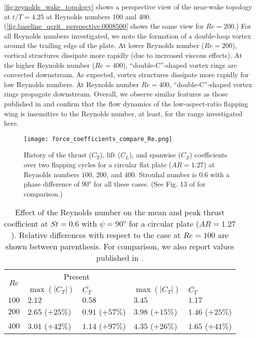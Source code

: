 \cref{fig:reynolds_wake_topology} shows a perspective view of the near-wake topology at $t/T = 4.25$ at Reynolds numbers $100$ and $400$.
(\cref{fig:baseline_qcrit_perspective:0008500} shows the same view for $Re = 200$.)
For all Reynolds numbers investigated, we note the formation of a double-loop vortex around the trailing edge of the plate.
At lower Reynolds number ($Re = 200$), vortical structures dissipate more rapidly (due to increased viscous effects).
At the higher  Reynolds number ($Re = 400$), ``double-C''-shaped vortex rings are convected downstream.
As expected, vortex structures dissipate more rapidly for low Reynolds numbers.
At Reynolds number $Re = 400$, ``double-C''-shaped vortex rings propagate downstream.
Overall, we observe similar features as those published in \citet{li_dong_2016} and confirm that the flow dynamics of the low-aspect-ratio flapping wing is insensitive to the Reynolds number, at least, for the range investigated here.

\begin{figure}[!h]
  \centering
  \texttt{[image: force\_coefficients\_compare\_Re.png]}
  \caption{History of the thrust ($C_T$), lift ($C_L$), and spanwise ($C_Z$) coefficients over two flapping cycles for a circular flat plate ($AR = 1.27$) at Reynolds numbers $100$, $200$, and $400$. Strouhal number is $0.6$ with a phase difference of $90^o$ for all these cases. (See Fig. 13 of \citet{li_dong_2016} for comparison.)}
  \label{fig:reynolds_force_coefficients}
\end{figure}

\begin{table}[!h]
  \centering
  \begin{tabular}{cllll}
    \hline\hline
    \multirow{2}{*}{$Re$} &
      \multicolumn{2}{c}{Present} &
      \multicolumn{2}{c}{\citet{li_dong_2016}} \\
    & $\max \left( |C_T| \right)$ & $\overline{C_T}$ & $\max \left( |C_T| \right)$ & $\overline{C_T}$ \\
    \hline
    $100$ & $2.12$ & $0.58$ & $3.45$ & $1.17$ \\
    $200$ & $2.65$ ($+25\%$) & $0.91$ ($+57\%$) & $3.98$ ($+15\%$) & $1.46$ ($+25\%$) \\
    $400$ & $3.01$ ($+42\%$) & $1.14$ ($+97\%$) & $4.35$ ($+26\%$) & $1.65$ ($+41\%$) \\
    \hline\hline
  \end{tabular}
  \caption{Effect of the Reynolds number on the mean and peak thrust coefficient at $St = 0.6$ with $\psi = 90^o$ for a circular plate ($AR = 1.27$). Relative differences with respect to the case at $Re = 100$ are shown between parenthesis. For comparison, we also report values published in \citet{li_dong_2016}.}
  \label{tab:reynolds_thrust_stats}
\end{table}

